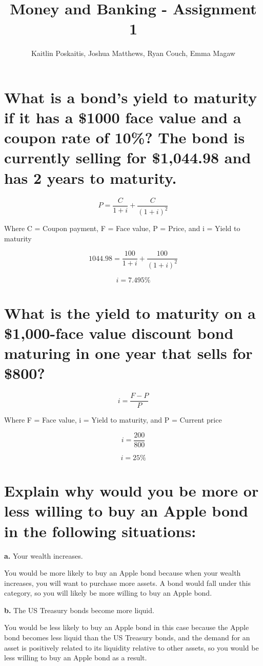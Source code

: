 \documentclass[12pt]{article}
\title{\bf Money and Banking - Assignment 1}
\author{Kaitlin Poskaitis, Joshua Matthews, Ryan Couch, Emma Magaw}
\date{}
\begin{document}
\maketitle

\section{What is a bond's yield to maturity if it has a \$1000 face value and a
coupon rate of 10\%? The bond is currently selling for \$1,044.98 and has 2 
years to maturity.}

$$P = \frac{C}{1+i} + \frac{C}{(1+i)^2}$$

Where C = Coupon payment, F = Face value, P = Price, and i = Yield to maturity

$$1044.98 = \frac{100}{1 + i} + \frac{100}{(1 + i)^2}$$

$$i = 7.495\%$$


\section{What is the yield to maturity on a \$1,000-face value discount bond
maturing in one year that sells for \$800?}

$$i = \frac{F - P}{P}$$

Where F = Face value, i = Yield to maturity, and P = Current price

$$i = \frac{200}{800}$$

$$i = 25\%$$


\section{Explain why would you be more or less willing to buy an Apple bond in
the following situations:}

{\bf a.} Your wealth increases.

You would be more likely to buy an Apple bond because when your wealth 
increases, you will want to purchase more assets. A bond would fall under this 
category, so you will likely be more willing to buy an Apple bond.

{\bf b.} The US Treasury bonds become more liquid.

You would be less likely to buy an Apple bond in this case because the Apple
bond becomes less liquid than the US Treasury bonds, and the demand for an 
asset is positively related to its liquidity relative to other assets, so
you would be less willing to buy an Apple bond as a result.
\end{document}
